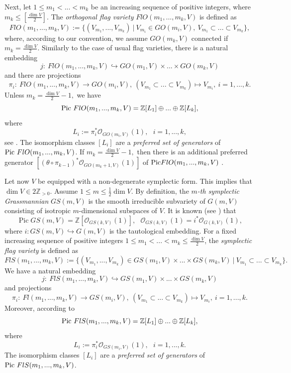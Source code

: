 \documentclass[12pt]{amsart}
\newcommand{\Pic}{\operatorname{Pic}\nolimits}
\theoremstyle{definition}
\begin{document}
Next, let $1\le m_1<...< m_k$ be an increasing sequence of 
positive integers, where $m_k\le [\frac{\dim V}{2}]$. The \textit{orthogonal flag variety} 
$FlO(m_1,...,m_k,V)$ is defined as
$$
FlO(m_1,...,m_k,V):=\{(V_{m_1},...,V_{m_k})\ |\ V_{m_i}\in GO(m_i,V),\ V_{m_1}\subset...\subset V_{m_k}\},
$$ 
where, according to our convention, we assume $GO(m_k,V)$
connected if $m_k=\frac{\dim V}{2}$.
Similarly to the case of usual flag varieties, there is a 
natural embedding 
$$
j:\ FlO(m_1,...,m_k,V)\hookrightarrow GO(m_1,V)\times...\times GO(m_k,V)
$$ 
and there are projections 
$$
\pi_i:\ FlO(m_1,...,m_k,V)\to GO(m_i,V),\ (V_{m_1}\subset...
\subset V_{m_k})\mapsto V_{m_i},\ i=1,...,k.
$$ 
Unless $m_k=\frac{\dim V}{2}-1,$ we have 
\begin{equation*}\label{Pic FlO}
{\rm{Pic}}~FlO(m_1,...,m_k,V)=\mathbb{Z}[L_1]\oplus...\oplus
\mathbb{Z}[L_k],
\end{equation*}
where
\begin{equation*}\label{generators ortho}
L_i:=\pi_i^*\mathcal{O}_{GO(m_i,V)}(1),\ \ \ i=1,...,k,
\end{equation*}
see \cite[Prop. 10.4]{Ot}.
The isomorphism classes $[L_i]$ are a \textit{preferred set 
of generators} of ${\rm{Pic}}~FlO(m_1,...,m_k,V)$. 
If $m_k=\frac{\dim V}{2}-1,$ then there is an additional
preferred generator $[(\theta\circ\pi_{k-1})^*
\mathcal{O}_{GO(m_k+1,V)}(1)]$ of ${\rm{Pic}}FlO(m_1,...,m_k,
V)$ \cite[Prop. 10.4]{Ot}.
\vspace{4mm}

Let now $V$ be equipped with a non-degenerate symplectic 
form. This implies that $\dim V\in2\mathbb{Z}_{>0}$. Assume 
$1\le m\le \frac{1}{2}\dim V$. By definition, the 
\textit{$m$-th symplectic Grassmannian} $GS(m,V)$ is the 
smooth irreducible subvariety of $G(m,V)$ consisting of 
isotropic $m$-dimensional subspaces of $V$. It is known 
(see \cite[Prop. 10.4]{Ot}) that
\begin{equation*}\label{Pic GS}
\Pic GS(m,V)=\mathbb{Z}[\mathcal{O}_{GS(k,V)}(1)],\ \ \  
\mathcal{O}_{GS(k,V)}(1)=i^*\mathcal{O}_{G(k,V)}(1),
\end{equation*}
where $i:GS(m,V)\hookrightarrow G(m,V)$ is the tautological 
embedding. For a fixed increasing sequence of positive integers $1\le m_1<...< m_k\le\frac{\dim V}{2}$, the 
\textit{symplectic flag variety} is defined as
$$
FlS(m_1,...,m_k,V):=\{(V_{m_1},...,V_{m_k})\in 
GS(m_1,V)\times...\times GS(m_k,V)\ |\ V_{m_1}\subset...
\subset V_{m_k}\}.
$$ 
We have a natural embedding 
$$
j:\ FlS(m_1,...,m_k,V)\hookrightarrow GS(m_1,V)\times...\times 
GS(m_k,V)
$$ 
and projections 
$$
\pi_i:\ Fl(m_1,...,m_k,V)\to GS(m_i,V),\ (V_{m_1}\subset ...
\subset V_{m_k})\mapsto V_{m_i},\ i=1,...,k.
$$ 
Moreover, according to \cite[Prop. 10.4]{Ot}
\begin{equation*}\label{Pic FlS}
{\rm{Pic}}~FlS(m_1,...,m_k,V)=\mathbb{Z}[L_1]\oplus...\oplus
\mathbb{Z}[L_k],
\end{equation*}
where
\begin{equation*}\label{generators sympl}
L_i:=\pi_i^*\mathcal{O}_{GS(m_i,V)}(1),\ \ \ i=1,...,k.
\end{equation*}
The isomorphism classes $[L_i]$ are a \textit{preferred set of 
generators} of ${\rm{Pic}}~FlS(m_1,...,m_k,V)$.
\end{document}
